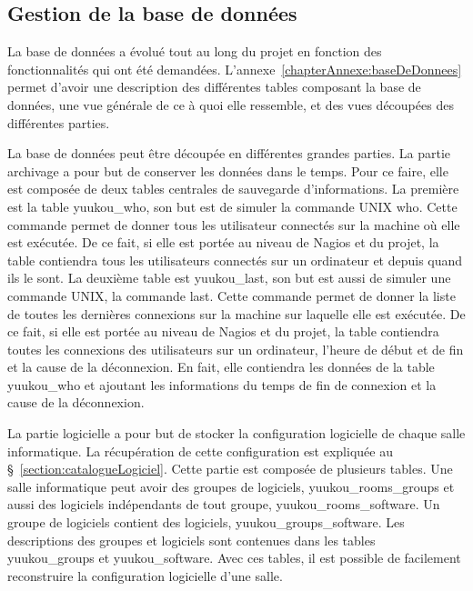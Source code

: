 \subsection{Gestion de la base de donn\'ees}

La base de donn\'ees a \'evolu\'e tout au long du projet en fonction des fonctionnalit\'es qui ont \'et\'e demand\'ees.
L'annexe~\ref{chapterAnnexe:baseDeDonnees} permet d'avoir une description des diff\'erentes tables composant la base de donn\'ees, une vue g\'en\'erale de ce \`a quoi elle ressemble, et des vues d\'ecoup\'ees des diff\'erentes parties.

La base de donn\'ees peut \^etre d\'ecoup\'ee en diff\'erentes grandes parties.
La partie archivage a pour but de conserver les donn\'ees dans le temps.
Pour ce faire, elle est compos\'ee de deux tables centrales de sauvegarde d'informations.
La premi\`ere est la table \textsf{yuukou\_who}, son but est de simuler la commande UNIX \textsf{who}.
Cette commande permet de donner tous les utilisateur connect\'es sur la machine o\`u elle est ex\'ecut\'ee.
De ce fait, si elle est port\'ee au niveau de Nagios et du projet, la table contiendra tous les utilisateurs connect\'es sur un ordinateur et depuis quand ils le sont.
La deuxi\`eme table est \textsf{yuukou\_last}, son but est aussi de simuler une commande UNIX, la commande \textsf{last}.
Cette commande permet de donner la liste de toutes les derni\`eres connexions sur la machine sur laquelle elle est ex\'ecut\'ee.
De ce fait, si elle est port\'ee au niveau de Nagios et du projet, la table contiendra toutes les connexions des utilisateurs sur un ordinateur, l'heure de d\'ebut et de fin et la cause de la d\'econnexion. En fait, elle contiendra les donn\'ees de la table \textsf{yuukou\_who} et ajoutant les informations du temps de fin de connexion et la cause de la d\'econnexion.

La partie logicielle a pour but de stocker la configuration logicielle de chaque salle informatique.
La r\'ecup\'eration de cette configuration est expliqu\'ee au \S~\ref{section:catalogueLogiciel}.
Cette partie est compos\'ee de plusieurs tables.
Une salle informatique peut avoir des groupes de logiciels, \textsf{yuukou\_rooms\_groups} et aussi des logiciels ind\'ependants de tout groupe, \textsf{yuukou\_rooms\_software}.
Un groupe de logiciels contient des logiciels, \textsf{yuukou\_groups\_software}.
Les descriptions des groupes et logiciels sont contenues dans les tables \textsf{yuukou\_groups} et \textsf{yuukou\_software}.
Avec ces tables, il est possible de facilement reconstruire la configuration logicielle d'une salle.


